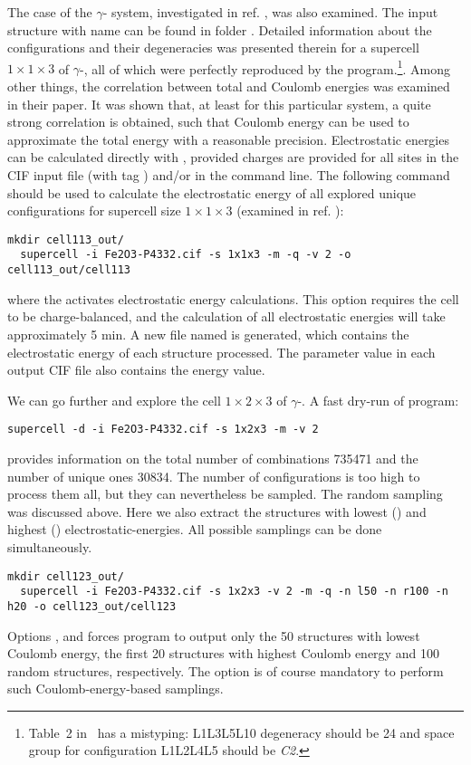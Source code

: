 \documentclass[a4paper,10pt]{article}
\begin{document}
The case of the $\gamma$- system, investigated in ref. \cite{Grau2010}, was also examined. The input structure with name  can be found in folder . Detailed information about the configurations and their degeneracies was presented therein for a supercell $1\times1\times3$ of $\gamma$-, all of which were perfectly reproduced by the \sups{} program.\footnote{Table~2 in~\cite{Grau2010} has a mistyping: L1L3L5L10 degeneracy should be 24 and space group for configuration L1L2L4L5 should be \textit{C2}.}. Among other things, the correlation between total and Coulomb energies was examined in their paper. It was shown that, at least for this particular system, a quite strong correlation is obtained, such that Coulomb energy can be used to approximate the total energy with a reasonable precision. Electrostatic energies can be calculated directly with \sups{}, provided charges are provided for all sites in the CIF input file (with tag ) and/or in the command line. The following command should be used to calculate the electrostatic energy of all explored unique configurations for supercell size $1\times1\times3$ (examined in ref. \cite{Grau2010}):
\begin{Verbatim}[breaklines]
  mkdir cell113_out/
  supercell -i Fe2O3-P4332.cif -s 1x1x3 -m -q -v 2 -o cell113_out/cell113 
\end{Verbatim}
where the  activates electrostatic energy calculations. This option requires the cell to be charge-balanced, and the calculation of all electrostatic energies will take approximately 5 min. A new file named  is generated, which contains the electrostatic energy of each structure processed. The  parameter value in each output CIF file also contains the energy value.

We can go further and explore the cell $1\times2\times3$ of $\gamma$-. A fast dry-run of \sups{} program:
\begin{Verbatim}[breaklines]
  supercell -d -i Fe2O3-P4332.cif -s 1x2x3 -m -v 2 
\end{Verbatim}
provides information on the total number of combinations \num{735471} and the number of unique ones \num{30834}. The number of configurations is too high to process them all, but they can nevertheless be sampled. The random sampling was discussed above. Here we also extract the structures with lowest () and highest () electrostatic-energies. All possible samplings can be done simultaneously. 
\begin{Verbatim}[breaklines]
  mkdir cell123_out/
  supercell -i Fe2O3-P4332.cif -s 1x2x3 -v 2 -m -q -n l50 -n r100 -n h20 -o cell123_out/cell123
\end{Verbatim}
Options ,  and  forces program to output only the 50 structures with lowest Coulomb energy, the first 20 structures with highest Coulomb energy and 100 random structures, respectively. The  option is of course mandatory to perform such Coulomb-energy-based samplings.
\end{document}
